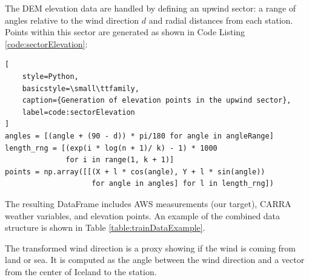The DEM elevation data are handled by defining an upwind sector: a range of angles relative to the wind direction $d$ and radial distances from each station. Points within this sector are generated as shown in Code Listing \ref{code:sectorElevation}:

\begin{lstlisting}[
    style=Python,
    basicstyle=\small\ttfamily,
    caption={Generation of elevation points in the upwind sector},
    label=code:sectorElevation
]
angles = [(angle + (90 - d)) * pi/180 for angle in angleRange]
length_rng = [(exp(i * log(n + 1)/ k) - 1) * 1000 
              for i in range(1, k + 1)]
points = np.array([[(X + l * cos(angle), Y + l * sin(angle))
                    for angle in angles] for l in length_rng])   
\end{lstlisting}

The resulting DataFrame includes AWS measurements (our target), CARRA weather variables, and elevation points. An example of the combined data structure is shown in Table \ref{table:trainDataExample}.

\begin{table}[h]
    \centering
    \caption[Example of combined data structure]{Example of the combined data structure of features used for modeling. Data include derived variables Richardson number (Ri) and squared Brunt–Väisälä frequency ($N^2$), station elevation (meters above sea level), transformed wind direction (twd), wind speed (ws$_{15}$), wind direction (wd$_{15}$), temperature ($t_{15}$), pressure ($p_{15}$) (CARRA values at 15 m height), and elevation points (from DEM) in a sector pointing upwind.}
    \label{table:trainDataExample}
\end{table}

The transformed wind direction is a proxy showing if the wind is coming from land or sea. It is computed as the angle between the wind direction and a vector from the center of Iceland to the station.


